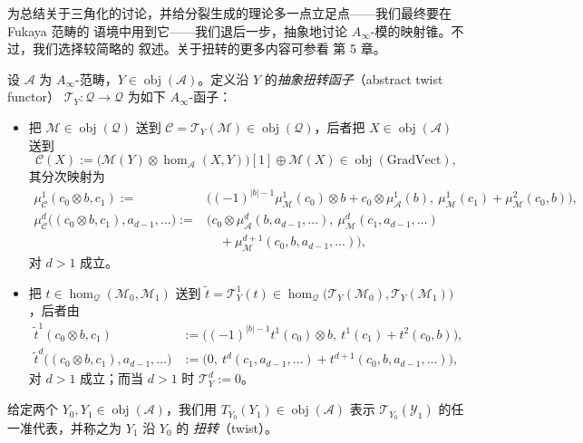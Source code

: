 为总结关于三角化的讨论，并给分裂生成的理论多一点立足点——我们最终要在 Fukaya 范畴的
语境中用到它——我们退后一步，抽象地讨论 $A_\infty$-模的映射锥。不过，我们选择较简略的
叙述。关于扭转的更多内容可参看 \cite{Sei08} 第 5 章。

\begin{Def}\label{def:4.20}
设 $\mathcal A$ 为 $A_\infty$-范畴，$Y\in\operatorname{obj}(\mathcal A)$。定义沿 $Y$
的\emph{抽象扭转函子}（abstract twist functor）
$\mathcal T_Y:\mathcal Q\to\mathcal Q$ 为如下 $A_\infty$-函子：
\begin{itemize}
  \item 把 $\mathcal M\in\operatorname{obj}(\mathcal Q)$ 送到
        $\mathcal C=\mathcal T_Y(\mathcal M)\in\operatorname{obj}(\mathcal Q)$，后者把
        $X\in\operatorname{obj}(\mathcal A)$ 送到
        \[
          \mathcal C(X):=\bigl(\mathcal M(Y)\otimes\hom_{\mathcal A}(X,Y)\bigr)[1]
          \oplus\mathcal M(X)\in\operatorname{obj}(\mathrm{GradVect}),
        \]
        其分次映射为
        \[
          \begin{aligned}
            \mu^1_{\mathcal C}(c_0\otimes b,c_1)
            :={}&\bigl((-1)^{|b|-1}\mu^1_{\mathcal M}(c_0)\otimes b
              +c_0\otimes\mu^1_{\mathcal A}(b),\ 
              \mu^1_{\mathcal M}(c_1)+\mu^2_{\mathcal M}(c_0,b)\bigr),\\
            \mu^d_{\mathcal C}\bigl((c_0\otimes b,c_1),a_{d-1},\dots\bigr)
            :={}&\bigl(c_0\otimes\mu^d_{\mathcal A}(b,a_{d-1},\dots),\ 
              \mu^d_{\mathcal M}(c_1,a_{d-1},\dots)\\
              &\quad+\mu^{d+1}_{\mathcal M}(c_0,b,a_{d-1},\dots)\bigr),
          \end{aligned}
        \]
        对 $d>1$ 成立。
  \item 把 $t\in\hom_{\mathcal Q}(\mathcal M_0,\mathcal M_1)$ 送到
        $\tilde t=\mathcal T^1_Y(t)\in\hom_{\mathcal Q}\bigl(\mathcal T_Y(\mathcal M_0),
        \mathcal T_Y(\mathcal M_1)\bigr)$，后者由
        \[
          \begin{aligned}
            \tilde t^1(c_0\otimes b,c_1)
            &:=\bigl((-1)^{|b|-1}t^1(c_0)\otimes b,\ t^1(c_1)+t^2(c_0,b)\bigr),\\
            \tilde t^d\bigl((c_0\otimes b,c_1),a_{d-1},\dots\bigr)
            &:=\bigl(0,\ t^d(c_1,a_{d-1},\dots)+t^{d+1}(c_0,b,a_{d-1},\dots)\bigr),
          \end{aligned}
        \]
        对 $d>1$ 成立；而当 $d>1$ 时 $\mathcal T^d_Y:=0$。
\end{itemize}
给定两个 $Y_0,Y_1\in\operatorname{obj}(\mathcal A)$，我们用
$T_{Y_0}(Y_1)\in\operatorname{obj}(\mathcal A)$ 表示
$\mathcal T_{Y_0}(\mathcal Y_1)$ 的任一准代表，并称之为 $Y_1$ 沿 $Y_0$ 的
\emph{扭转}（twist）。
\end{Def}

